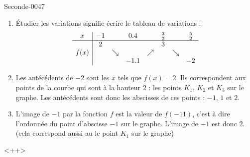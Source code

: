 \begin{corrige}{Seconde-0047}
\begin{enumerate}
        \item
            Étudier les variations signifie écrire le tableau de variations :
            \begin{equation*}
                \begin{array}[]{c|ccccccc}
                    x&-1&&0.4&&\frac{ 3 }{2}&&\frac{ 5 }{2}\\
                    \hline
                    &2&&&&3&&\\
                    f(x)&&\searrow&&\nearrow&&\searrow&\\
                    &&&-1.1&&&&-2\\
                \end{array}
            \end{equation*}
        \item
            Les antécédents de \( -2\) sont les \( x\) tels que \( f(x)=2\). Ils correspondent aux points de la courbe qui sont à la hauteur \( 2\) : les points \( K_1\), \( K_2\) et \( K_3\) sur le graphe. Les antécédents sont donc les abscisses de ces points : \( -1\), \( 1 \) et \( 2\).
        \item
            L'image de \( -1\) par la fonction \( f\) est la valeur de \( f(-11)\), c'est à dire l'ordonnée du point d'abscisse \( -1\) sur le graphe. L'image de \( -1 \) est donc \( 2\). (cela correspond aussi au le point \( K_1\) sur le graphe)
    \end{enumerate}
    <++>

\end{corrige}
